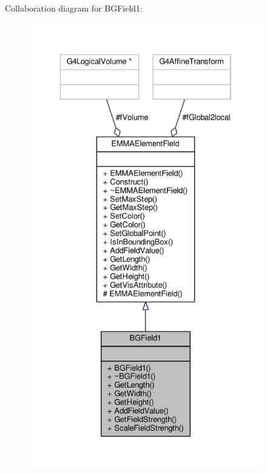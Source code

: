 Collaboration diagram for B\+G\+Field1\+:
\nopagebreak
\begin{figure}[H]
\begin{center}
\leavevmode
\includegraphics[height=550pt]{classBGField1__coll__graph}
\end{center}
\end{figure}
